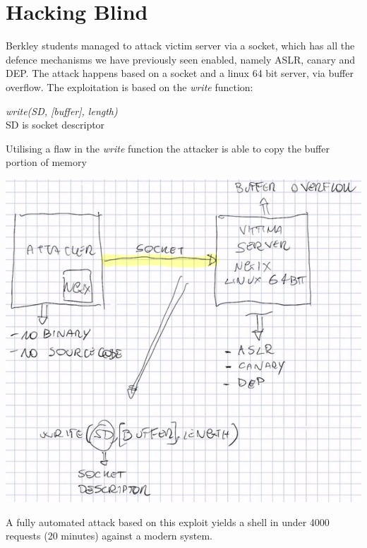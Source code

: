 \documentclass[11pt, oneside]{article}   	%
\begin{document}
\section*{Hacking Blind}
Berkley students managed to attack victim server via a socket, which has all the defence mechanisms we have previously seen enabled, namely ASLR, canary and DEP. The attack happens based on a socket and a linux 64 bit server, via buffer overflow. The exploitation is based on the \emph{write} function:\begin{center}
\emph{write(SD, [buffer], length)}\\
SD is socket descriptor
\end{center}
Utilising a flaw in the \emph{write} function the attacker is able to copy the buffer portion of memory
\begin{center}
\includegraphics[scale = 0.5]{socket}
\end{center}
A fully automated attack based on this exploit yields a shell in under 4000 requests (20 minutes) against a modern system. 
\end{document}
